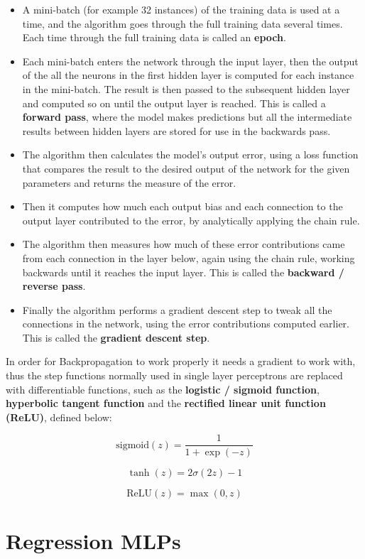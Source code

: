 \documentclass[12pt letter]{report}
\begin{document}
\begin{itemize}
\item
  A mini-batch (for example 32 instances) of the training data is used
  at a time, and the algorithm goes through the full training data
  several times. Each time through the full training data is called an
  \textbf{epoch}.
\item
  Each mini-batch enters the network through the input layer, then the
  output of the all the neurons in the first hidden layer is computed
  for each instance in the mini-batch. The result is then passed to the
  subsequent hidden layer and computed so on until the output layer is
  reached. This is called a \textbf{forward pass}, where the model makes
  predictions but all the intermediate results between hidden layers are
  stored for use in the backwards pass.
\item
  The algorithm then calculates the model's output error, using a loss
  function that compares the result to the desired output of the network
  for the given parameters and returns the measure of the error.
\item
  Then it computes how much each output bias and each connection to the
  output layer contributed to the error, by analytically applying the
  chain rule.
\item
  The algorithm then measures how much of these error contributions came
  from each connection in the layer below, again using the chain rule,
  working backwards until it reaches the input layer. This is called the
  \textbf{backward / reverse pass}.
\item
  Finally the algorithm performs a gradient descent step to tweak all
  the connections in the network, using the error contributions computed
  earlier. This is called the \textbf{gradient descent step}.
\end{itemize}

In order for Backpropagation to work properly it needs a gradient to
work with, thus the step functions normally used in single layer
perceptrons are replaced with differentiable functions, such as the
\textbf{logistic / sigmoid function}, \textbf{hyperbolic tangent
function} and the \textbf{rectified linear unit function (ReLU)},
defined below:

\[
\text{sigmoid}(z) = \frac{1}{1 + \exp(-z)}
\]

\[
\tanh(z) = 2 \sigma(2z) - 1
\]

\[
\text{ReLU}(z) = \max(0, z)
\]

\section{Regression MLPs}\label{regression-mlps}
\end{document}
